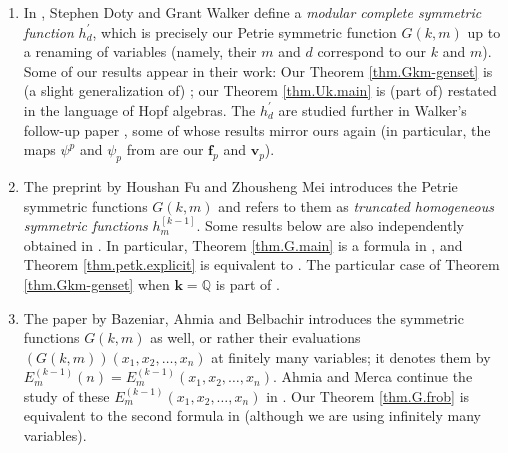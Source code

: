 \documentclass[numbers=enddot,12pt,final,onecolumn,notitlepage]{scrartcl}%
\theoremstyle{definition}
\begin{document}
\begin{enumerate}
\item[\textbf{(a)}] In \cite[\S 3.3]{DotWal92}, Stephen Doty and Grant Walker
define a \emph{modular complete symmetric function }$h_{d}^{\prime}$, which is
precisely our Petrie symmetric function $G\left(  k,m\right)  $ up to a
renaming of variables (namely, their $m$ and $d$ correspond to our $k$ and
$m$). Some of our results appear in their work: Our Theorem
\ref{thm.Gkm-genset} is (a slight generalization of) \cite[Corollary
3.9]{DotWal92}; our Theorem \ref{thm.Uk.main} is (part of) \cite[Proposition
3.15]{DotWal92} restated in the language of Hopf algebras. The $h_{d}^{\prime
}$ are studied further in Walker's follow-up paper \cite{Walker94}, some of
whose results mirror ours again (in particular, the maps $\psi^{p}$ and
$\psi_{p}$ from \cite{Walker94} are our $\mathbf{f}_{p}$ and $\mathbf{v}_{p}$).

\item[\textbf{(b)}] The preprint \cite{FuMei20} by Houshan Fu and Zhousheng
Mei introduces the Petrie symmetric functions $G\left(  k,m\right)  $ and
refers to them as \emph{truncated homogeneous symmetric functions}
$h_{m}^{\left[  k-1\right]  }$. Some results below are also independently
obtained in \cite{FuMei20}. In particular, Theorem \ref{thm.G.main} is a
formula in \cite[\S 2]{FuMei20}, and Theorem \ref{thm.petk.explicit} is
equivalent to \cite[Proposition 2.9]{FuMei20}. The particular case of Theorem
\ref{thm.Gkm-genset} when $\mathbf{k}=\mathbb{Q}$ is part of \cite[Theorem
2.7]{FuMei20}.

\item[\textbf{(c)}] The paper \cite{BaAhBe18} by Bazeniar, Ahmia and Belbachir
introduces the symmetric functions $G\left(  k,m\right)  $ as well, or rather
their evaluations $\left(  G\left(  k,m\right)  \right)  \left(  x_{1}%
,x_{2},\ldots,x_{n}\right)  $ at finitely many variables; it denotes them by
$E_{m}^{\left(  k-1\right)  }\left(  n\right)  =E_{m}^{\left(  k-1\right)
}\left(  x_{1},x_{2},\ldots,x_{n}\right)  $. Ahmia and Merca continue the
study of these $E_{m}^{\left(  k-1\right)  }\left(  x_{1},x_{2},\ldots
,x_{n}\right)  $ in \cite{AhmMer20}. Our Theorem \ref{thm.G.frob} is
equivalent to the second formula in \cite[Theorem 3.3]{AhmMer20} (although we
are using infinitely many variables).


\end{enumerate}
\end{document}
